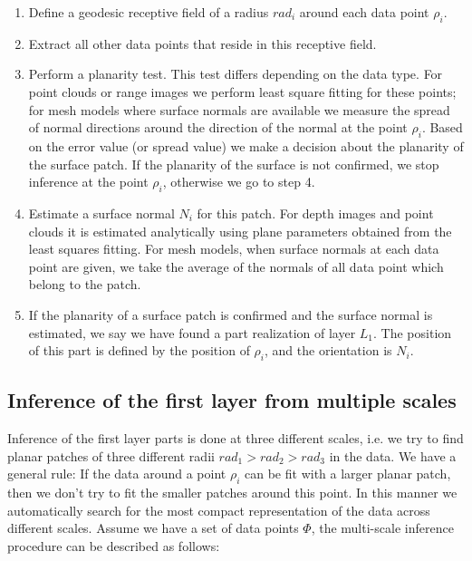 \documentclass[runningheads]{llncs}
\begin{document}
\begin{enumerate}
\item Define a geodesic receptive field of a radius $rad_i$ around each data point $\rho_i$.
\item Extract all other data points that reside in this
receptive field.
\item Perform a planarity test. This test differs depending
on the data type. For point clouds or range images we perform least
square fitting for these points; for mesh models where surface
normals are available we measure the spread of normal directions
around the direction of the normal at the point $\rho_i$. Based on
the error value (or spread value) we make a decision about the
planarity of the surface patch. If the planarity of the surface is
not confirmed, we stop inference at the point $\rho_i$, otherwise we
go to step 4.
\item Estimate a surface normal $N_i$ for this patch. For depth images and point clouds it is
estimated analytically using plane parameters obtained from the
least squares fitting. For mesh models, when surface normals at each
data point are given, we take the average of the normals of all data
point which belong to the patch.
\item If the planarity of a surface patch is confirmed and the surface normal is
estimated, we say we have found a part realization of layer $L_1$.
The position of this part is defined by the position of $\rho_i$,
and the orientation is $N_i$.
\end{enumerate}


\subsection{Inference of the first layer from multiple scales\label{sec:InferenceFirstMultiple}}

Inference of the first layer parts is done at three different
scales, i.e. we try to find planar patches of three different radii
$rad_1 > rad_2 > rad_3$ in the data. We have a general rule: If the
data around a point $\rho_i$ can be fit with a larger planar patch,
then we don't try to fit the smaller patches around this point. In
this manner we automatically search for the most compact
representation of the data across different scales. Assume we have a
set of data points $\Phi$, the multi-scale inference procedure can
be described as follows:
\end{document}

